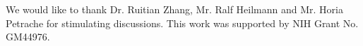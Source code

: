 We would like to thank Dr. Ruitian Zhang, Mr. Ralf Heilmann and Mr. Horia 
Petrache for stimulating discussions. This work was supported by NIH Grant 
No. GM44976.

%

